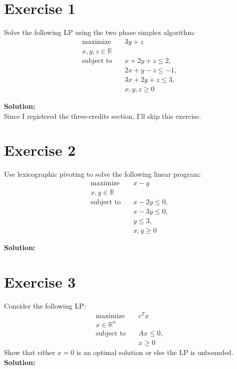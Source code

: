\documentclass{article}
\begin{document}
\section*{Exercise 1}
Solve the following LP using the two phase simplex algorithm:
\begin{align*}
\text{maximize} \quad & 3y + z \\
x, y, z \in \mathbb{R} & \\
\text{subject to} \quad & x + 2y + z \leq 2, \\
& 2x + y - z \leq -1, \\
& 3x + 2y + z \leq 3, \\
& x, y, z \geq 0
\end{align*}

\textbf{Solution:} \\

Since I registered the three-credits section, I'll skip this exercise.

\newpage

\section*{Exercise 2}
Use lexicographic pivoting to solve the following linear program:
\begin{align*}
\text{maximize} \quad & x - y \\
x, y \in \mathbb{R} & \\
\text{subject to} \quad & x - 2y \leq 0, \\
& x - 3y \leq 0, \\
& y \leq 3, \\
& x, y \geq 0
\end{align*}

\textbf{Solution:}

\newpage

\section*{Exercise 3}
Consider the following LP:
\begin{align*}
\text{maximize} \quad & c^T x \\
x \in \mathbb{R}^n & \\
\text{subject to} \quad & Ax \leq 0, \\
& x \geq 0
\end{align*}
Show that either $x = 0$ is an optimal solution or else the LP is unbounded. \\

\textbf{Solution:} \\
\end{document}
